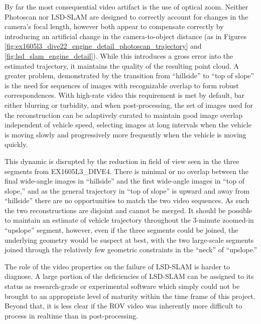 \documentclass[letterpaper,12pt]{article}
\begin{document}
By far the most consequential video artifact is the use of optical zoom.   Neither Photoscan nor LSD-SLAM are designed to correctly account for changes in the camera's focal length, however both appear to compensate correctly by introducing an artificial change in the camera-to-object distance (as in Figures \ref{fig:ex1605l3_dive22_engine_detail_photoscan_trajectory} and \ref{fig:lsd_slam_engine_detail}).   While this introduces a gross error into the estimated trajectory, it maintains the quality of the resulting point cloud.    A greater problem, demonstrated by the transition from ``hillside'' to ``top of slope'' is the need for sequences of images with recognizable overlap to form robust correspondences.  With high-rate video this requirement is met by default, bar either blurring or turbidity, and when post-processing, the set of images used for the reconstruction can be adaptively curated to maintain good image overlap independent of vehicle speed, selecting images at long intervals when the vehicle is moving slowly and progressively more frequently when the vehicle is moving quickly.

This dynamic is disrupted by the reduction in field of view seen in the three segments from EX1605L3\_DIVE4.    There is minimal or no overlap between the final wide-angle images in ``hillside'' and the first wide-angle images in ``top of slope,'' and as the general trajectory in ``top of slope'' is upward and away from ``hillside'' there are no opportunities to match the two video sequences.   As such the two reconstructions are disjoint and cannot be merged.    It should be possible to maintain an estimate of vehicle trajectory throughout the 3-minute zoomed-in ``upslope'' segment, however, even if the three segments could be joined, the underlying geometry would be suspect at best, with the two large-scale segments joined through the relatively few geometric constraints in the ``neck'' of ``upslope.'' 

The role of the video properties on the failure of LSD-SLAM is harder to diagnose.   A large portion of the deficiencies of LSD-SLAM can be assigned to its status as research-grade or experimental software which simply could not be brought to an appropriate level of maturity within the time frame of this project.    Beyond that, it is less clear if the ROV video was inherently more difficult to process in realtime than in post-processing.
\end{document}

